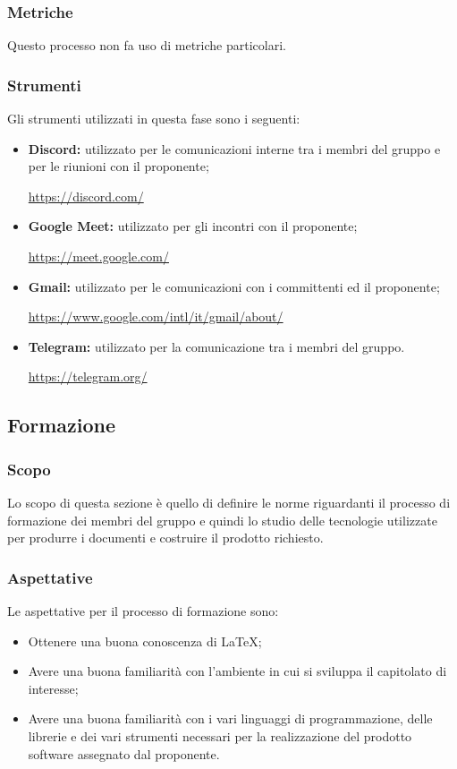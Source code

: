 \subsubsection{Metriche}
Questo processo non fa uso di metriche particolari.
\subsubsection{Strumenti}
Gli strumenti utilizzati in questa fase sono i seguenti:
\begin{itemize}
  \item \textbf{Discord:} utilizzato per le comunicazioni interne tra i membri del gruppo e per le riunioni con il proponente;
  \begin{center}
    \url{https://discord.com/}
  \end{center}  
  \item \textbf{Google Meet:} utilizzato per gli incontri con il proponente;
  \begin{center}
    \url{https://meet.google.com/}
  \end{center} 
  \item \textbf{Gmail:} utilizzato per le comunicazioni con i committenti ed il proponente;
  \begin{center}
    \url{https://www.google.com/intl/it/gmail/about/}
  \end{center} 
  \item \textbf{Telegram:} utilizzato per la comunicazione tra i membri del gruppo.
  \begin{center}
    \url{https://telegram.org/}
  \end{center} 
\end{itemize} 
\vspace{2cm}


\subsection{Formazione} \label{subsection: formazione}
\subsubsection {Scopo}
Lo scopo di questa sezione è quello di definire le norme riguardanti il processo di formazione dei membri del gruppo \groupName{} e quindi lo studio delle tecnologie utilizzate per produrre i documenti e costruire il prodotto richiesto.
\subsubsection {Aspettative}
Le aspettative per il processo di formazione sono:
\begin {itemize}
\item Ottenere una buona conoscenza di \LaTeX{};
\item Avere una buona familiarità con l'ambiente in cui si sviluppa il capitolato di interesse;
\item Avere una buona familiarità con i vari linguaggi di programmazione, delle librerie e dei vari strumenti necessari per la realizzazione del prodotto software assegnato dal proponente.
\end {itemize}
